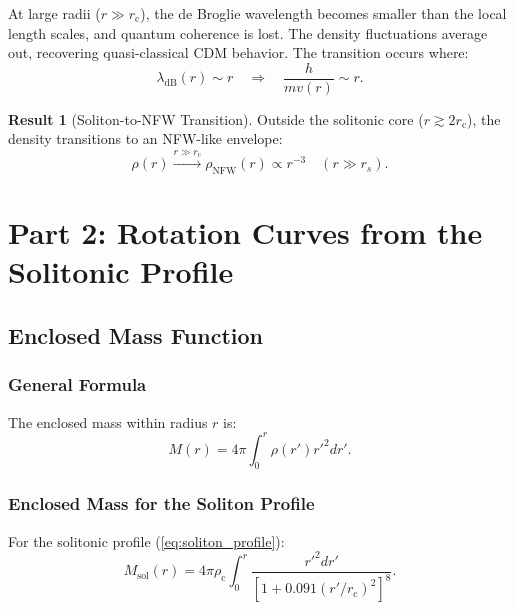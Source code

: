 \documentclass[11pt,a4paper]{article}
\newcommand{\lambdadB}{\ensuremath{\lambda_{\mathrm{dB}}}}
\newcommand{\rc}{\ensuremath{r_{\mathrm{c}}}}
\newcommand{\rhoc}{\ensuremath{\rho_{\mathrm{c}}}}
\theoremstyle{definition}
\newtheorem{result}{Result}
\theoremstyle{remark}
\begin{document}
At large radii ($r \gg \rc$), the de Broglie wavelength becomes smaller than the local length scales, and quantum coherence is lost. The density fluctuations average out, recovering quasi-classical CDM behavior. The transition occurs where:
\begin{equation}
\lambdadB(r) \sim r \quad \Rightarrow \quad \frac{h}{m v(r)} \sim r.
\end{equation}

\begin{result}[Soliton-to-NFW Transition]
Outside the solitonic core ($r \gtrsim 2\rc$), the density transitions to an NFW-like envelope:
\begin{equation}
\rho(r) \xrightarrow{r \gg \rc} \rho_{\mathrm{NFW}}(r) \propto r^{-3} \quad (r \gg r_s).
\end{equation}
\end{result}

\section{Part 2: Rotation Curves from the Solitonic Profile}
\label{sec:rotation_curves}

\subsection{Enclosed Mass Function}
\label{sec:enclosed_mass}

\subsubsection{General Formula}

The enclosed mass within radius $r$ is:
\begin{equation}
\label{eq:enclosed_mass}
M(r) = 4\pi \int_0^r \rho(r') r'^2 dr'.
\end{equation}

\subsubsection{Enclosed Mass for the Soliton Profile}

For the solitonic profile (\ref{eq:soliton_profile}):
\begin{equation}
M_{\mathrm{sol}}(r) = 4\pi \rhoc \int_0^r \frac{r'^2 dr'}{[1 + 0.091(r'/\rc)^2]^8}.
\end{equation}
\end{document}
